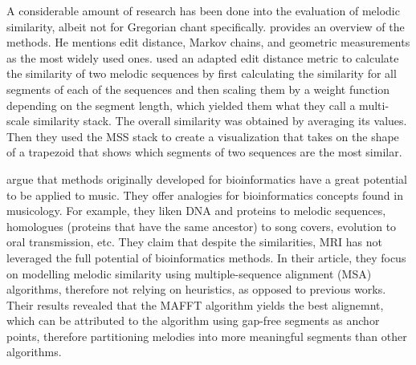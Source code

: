A considerable amount of research has been done into the evaluation of melodic similarity, albeit not for Gregorian chant specifically.
\cite{melodic_similarity} provides an overview of the methods. He mentions edit distance, Markov chains, and geometric measurements as
the most widely used ones. \cite{similarity_plot} used an adapted edit distance metric to calculate the similarity of two melodic sequences
by first calculating the similarity for all segments of each of the sequences and then scaling them by a weight function depending on the
segment length, which yielded them what they call a multi-scale similarity stack. The overall similarity was obtained by averaging its values.
Then they used the MSS stack to create a visualization that takes on the shape of a trapezoid that shows which segments of two sequences
are the most similar.

\cite{similarity_bioinf} argue that methods originally developed for bioinformatics have a great potential to be applied to music. They offer
analogies for bioinformatics concepts found in musicology. For example, they liken DNA and proteins to melodic sequences, homologues (proteins that
have the same ancestor) to song covers, evolution to oral transmission, etc. They claim that despite the similarities, MRI has not leveraged the
full potential of bioinformatics methods. In their article, they focus on modelling melodic similarity using multiple-sequence alignment (MSA)
algorithms, therefore not relying on heuristics, as opposed to previous works. Their results revealed that the MAFFT algorithm yields the best
alignemnt, which can be attributed to the algorithm using gap-free segments as anchor points, therefore partitioning melodies into more meaningful
segments than other algorithms.
